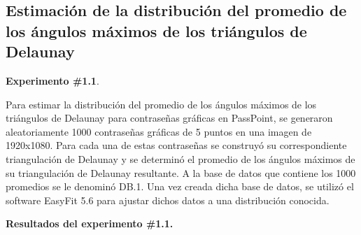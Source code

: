 \documentclass[12pt]{report}
\begin{document}
\subsection{Estimación de la distribución del promedio de los ángulos máximos de los triángulos de Delaunay }
	\textbf{Experimento \#1.1}.
	
	 Para estimar la distribución del promedio de los ángulos máximos de los triángulos de Delaunay para contraseñas gráficas en PassPoint, se generaron aleatoriamente 1000 contraseñas gráficas de 5 puntos en una imagen de 1920x1080. Para cada una de estas contraseñas se  construyó  su correspondiente triangulación  de Delaunay  y se  determinó el promedio  de los ángulos máximos de su triangulación de Delaunay resultante. A la base de datos que contiene los 1000 promedios se le denominó DB.1. Una vez creada dicha base de datos, se utilizó el software EasyFit 5.6 para ajustar dichos datos a una distribución conocida.
	 
	 \textbf{Resultados del experimento \#1.1.}
	 
\end{document}

